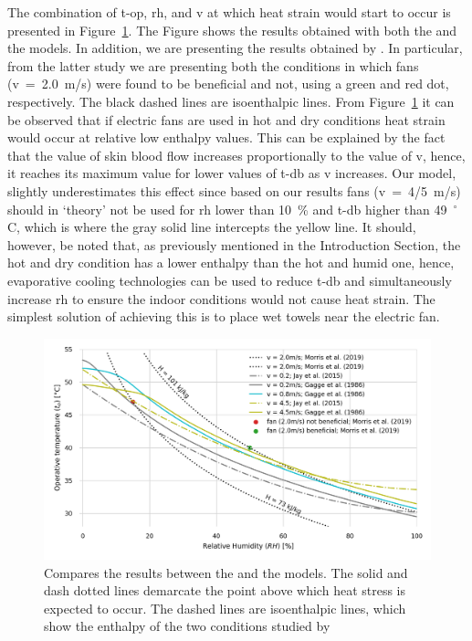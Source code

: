 The combination of \ac{t-op}, \ac{rh}, and \ac{v} at which heat strain would start to occur is presented in Figure~\ref{fig:comparison_air_speed}.
The Figure shows the results obtained with both the  and the  models.
In addition, we are presenting the results obtained by .
In particular, from the latter study we are presenting both the conditions in which fans (\ac{v}~=~2.0~m/s) were found to be beneficial and not, using a green and red dot, respectively.
The black dashed lines are isoenthalpic lines.
From Figure~\ref{fig:comparison_air_speed} it can be observed that if electric fans are used in hot and dry conditions heat strain would occur at relative low enthalpy values.
This can be explained by the fact that the value of skin blood flow increases proportionally to the value of \ac{v}, hence, it reaches its maximum value for lower values of \ac{t-db} as \ac{v} increases.
Our model, slightly underestimates this effect since based on our results fans (\ac{v}~=~4/5~m/s) should in `theory' not be used for \ac{rh} lower than 10~\% and \ac{t-db} higher than 49~$^{\circ}$C\@, which is where the gray solid line intercepts the yellow line.
It should, however, be noted that, as previously mentioned in the Introduction Section, the hot and dry condition has a lower enthalpy than the hot and humid one, hence, evaporative cooling technologies can be used to reduce \ac{t-db} and simultaneously increase \ac{rh} to ensure the indoor conditions would not cause heat strain.
The simplest solution of achieving this is to place wet towels near the electric fan.

\begin{figure}[thb!]
    \centering
    \includegraphics[width=\textwidth]{figures/comparison_air_speed.png}
    \caption{Compares the results between the  and the  models.
    The solid and dash dotted lines demarcate the point above which heat stress is expected to occur.
    The dashed lines are isoenthalpic lines, which show the enthalpy of the two conditions studied by }
    \label{fig:comparison_air_speed}
\end{figure}

